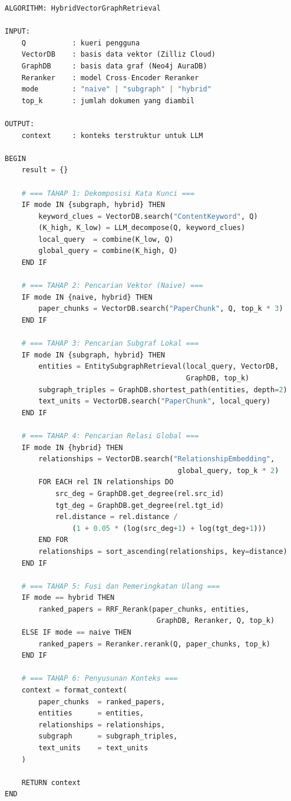 \BukaLampiran



\begin{lstlisting}[language=Python, caption={Algoritma \textit{Hybrid Vector-Graph Retrieval}}]
ALGORITHM: HybridVectorGraphRetrieval

INPUT:
    Q           : kueri pengguna
    VectorDB    : basis data vektor (Zilliz Cloud)
    GraphDB     : basis data graf (Neo4j AuraDB)
    Reranker    : model Cross-Encoder Reranker
    mode        : "naive" | "subgraph" | "hybrid"
    top_k       : jumlah dokumen yang diambil

OUTPUT:
    context     : konteks terstruktur untuk LLM

BEGIN
    result = {}

    # === TAHAP 1: Dekomposisi Kata Kunci ===
    IF mode IN {subgraph, hybrid} THEN
        keyword_clues = VectorDB.search("ContentKeyword", Q)
        (K_high, K_low) = LLM_decompose(Q, keyword_clues)
        local_query  = combine(K_low, Q)
        global_query = combine(K_high, Q)
    END IF

    # === TAHAP 2: Pencarian Vektor (Naive) ===
    IF mode IN {naive, hybrid} THEN
        paper_chunks = VectorDB.search("PaperChunk", Q, top_k * 3)
    END IF

    # === TAHAP 3: Pencarian Subgraf Lokal ===
    IF mode IN {subgraph, hybrid} THEN
        entities = EntitySubgraphRetrieval(local_query, VectorDB,
                                           GraphDB, top_k)
        subgraph_triples = GraphDB.shortest_path(entities, depth=2)
        text_units = VectorDB.search("PaperChunk", local_query)
    END IF

    # === TAHAP 4: Pencarian Relasi Global ===
    IF mode IN {hybrid} THEN
        relationships = VectorDB.search("RelationshipEmbedding",
                                         global_query, top_k * 2)
        FOR EACH rel IN relationships DO
            src_deg = GraphDB.get_degree(rel.src_id)
            tgt_deg = GraphDB.get_degree(rel.tgt_id)
            rel.distance = rel.distance /
                (1 + 0.05 * (log(src_deg+1) + log(tgt_deg+1)))
        END FOR
        relationships = sort_ascending(relationships, key=distance)
    END IF

    # === TAHAP 5: Fusi dan Pemeringkatan Ulang ===
    IF mode == hybrid THEN
        ranked_papers = RRF_Rerank(paper_chunks, entities,
                                    GraphDB, Reranker, Q, top_k)
    ELSE IF mode == naive THEN
        ranked_papers = Reranker.rerank(Q, paper_chunks, top_k)
    END IF

    # === TAHAP 6: Penyusunan Konteks ===
    context = format_context(
        paper_chunks  = ranked_papers,
        entities      = entities,
        relationships = relationships,
        subgraph      = subgraph_triples,
        text_units    = text_units
    )

    RETURN context
END
\end{lstlisting}
